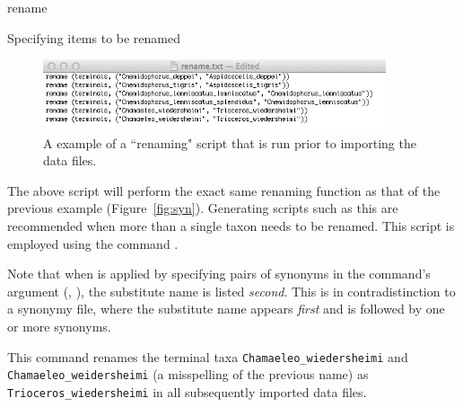 \begin{command}{rename}{}
\begin{arguments}
\begin{argumentgroup}{Specifying items to be renamed}
{\begin{figure}[th!]
\begin{center}
\includegraphics[width=0.9\textwidth]{doc/figures/rename.jpg}
\end{center}
\caption{A example of a ``renaming" script that is run prior to importing the data files.}
\label{fig:rename}
\end{figure}


The above script will perform the exact same renaming function as that of the previous example 
(Figure~\ref{fig:syn}). Generating scripts such as this are recommended when more than a single
 taxon needs to be renamed. This script is employed using the command . 
}
{}    

\begin{statement}
Note that when  is applied by specifying pairs of
synonyms in the command's argument (\poystring, \poystring),
the substitute name is listed \emph{second}. This is in contradistinction to 
a synonymy file, where the substitute name 
appears \emph{first} and is followed by one or more synonyms.
\end{statement}
\end{argumentgroup}

\end{arguments}

\begin{poyexamples}



{This command renames the terminal taxa \texttt{Chamaeleo\_wiedersheimi} 
and \texttt{Chamaeleo\_weidersheimi} (a misspelling of the previous name) as 
\texttt{Trioceros\_wiedersheimi} in all subsequently imported data files.}

\end{poyexamples}

\end{command}

